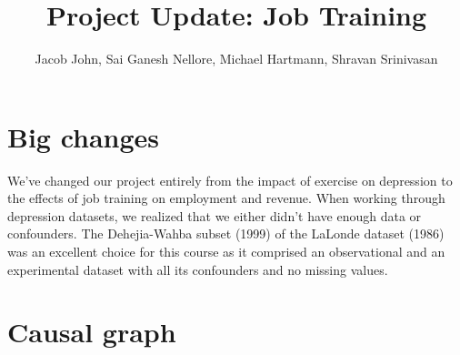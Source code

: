 \documentclass[12pt]{article}
\title{Project Update: Job Training}
\author{Jacob John, Sai Ganesh Nellore, Michael Hartmann, Shravan Srinivasan}
\begin{document}
\maketitle

\section{Big changes}

We've changed our project entirely from the impact of exercise on depression to the effects of job training on employment and revenue. When working through depression datasets, we realized that we either didn't have enough data or confounders. The Dehejia-Wahba subset (1999) \cite{dehejia1999} of the LaLonde dataset (1986) \cite{lalonde1986} was an excellent choice for this course as it comprised an observational and an experimental dataset with all its confounders and no missing values.

\section{Causal graph} \label{sec:graph}
\end{document}
